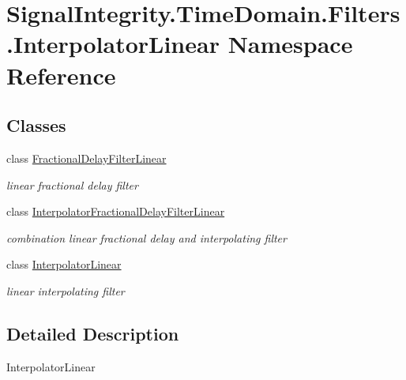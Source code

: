\hypertarget{namespaceSignalIntegrity_1_1TimeDomain_1_1Filters_1_1InterpolatorLinear}{}\section{Signal\+Integrity.\+Time\+Domain.\+Filters.\+Interpolator\+Linear Namespace Reference}
\label{namespaceSignalIntegrity_1_1TimeDomain_1_1Filters_1_1InterpolatorLinear}
\subsection*{Classes}
\begin{DoxyCompactItemize}
\item 
class \hyperlink{classSignalIntegrity_1_1TimeDomain_1_1Filters_1_1InterpolatorLinear_1_1FractionalDelayFilterLinear}{Fractional\+Delay\+Filter\+Linear}
\begin{DoxyCompactList}\small\item\em linear fractional delay filter \end{DoxyCompactList}\item 
class \hyperlink{classSignalIntegrity_1_1TimeDomain_1_1Filters_1_1InterpolatorLinear_1_1InterpolatorFractionalDelayFilterLinear}{Interpolator\+Fractional\+Delay\+Filter\+Linear}
\begin{DoxyCompactList}\small\item\em combination linear fractional delay and interpolating filter \end{DoxyCompactList}\item 
class \hyperlink{classSignalIntegrity_1_1TimeDomain_1_1Filters_1_1InterpolatorLinear_1_1InterpolatorLinear}{Interpolator\+Linear}
\begin{DoxyCompactList}\small\item\em linear interpolating filter \end{DoxyCompactList}\end{DoxyCompactItemize}


\subsection{Detailed Description}
\begin{DoxyVerb}InterpolatorLinear\end{DoxyVerb}
 